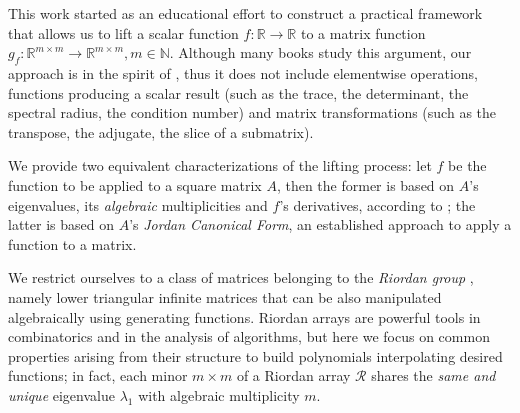 
This work started as an educational effort to construct a practical framework
that allows us to lift a scalar function $f: \mathbb{R}\rightarrow\mathbb{R}$
to a matrix function $g_{f}: \mathbb{R}^{m\times
m}\rightarrow\mathbb{R}^{m\times m}, m\in\mathbb{N}$. Although many books
\citep{Gantmacher1959, GL1996, HJ1991, LT1985} study this argument, our approach
is in the spirit of \citep{Higham2008}, thus it does not include elementwise
operations, functions producing a scalar  result (such as the trace, the
determinant, the spectral radius, the condition number) and matrix
transformations (such as the transpose, the adjugate, the slice of a
submatrix).

We provide two equivalent characterizations of the lifting process: let $f$ be
the function to be applied to a square matrix $A$, then the former is based on
$A$'s eigenvalues, its \textit{algebraic} multiplicities and $f$'s derivatives,
according to \citep{RUNCKEL1983161, VERDESTAR2005285}; the latter is
based on $A$'s \textit{Jordan Canonical Form}, an established approach to
apply a function to a matrix.

We restrict ourselves to a class of matrices belonging to the \textit{Riordan
group} \citep{MRSV97, SHAPIRO1991229, SPRUGNOLI1994267, HE201515}, namely lower
triangular infinite matrices that can be also manipulated algebraically using
generating functions.  Riordan arrays are powerful tools in combinatorics and
in the analysis of algorithms, but here we focus on common properties arising
from their structure to build polynomials interpolating desired functions; in
fact, each minor $m\times m$ of a Riordan array $\mathcal{R}$ shares the
\textit{same and unique} eigenvalue $\lambda_{1}$ with algebraic multiplicity
$m$.

